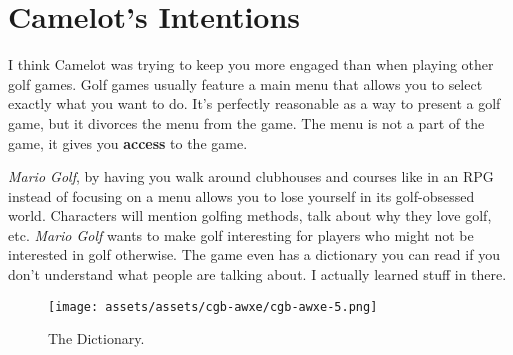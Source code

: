 \documentclass{book}
\let\oldcenter\center
\let\oldendcenter\endcenter
\renewenvironment{center}{\setlength\topsep{0pt}\oldcenter}{\oldendcenter}
\begin{document}
\FloatBarrier\needspace{10mm}\section*{Camelot’s Intentions}\nopagebreak[4]

I think Camelot was trying to keep you more engaged than when playing other golf games. Golf games usually feature a main menu that allows you to select exactly what you want to do. It’s perfectly reasonable as a way to present a golf game, but it divorces the menu from the game. The menu is not a part of the game, it gives you \textbf{access} to the game.

\begin{center}
\vspace{8pt}
\quad\vspace{4pt}
\end{center}

\emph{Mario Golf}, by having you walk around clubhouses and courses like in an RPG instead of focusing on a menu allows you to lose yourself in its golf-obsessed world. Characters will mention golfing methods, talk about why they love golf, etc. \emph{Mario Golf} wants to make golf interesting for players who might not be interested in golf otherwise. The game even has a dictionary you can read if you don’t understand what people are talking about. I actually learned stuff in there.

\begin{figure}[hbt]
\vskip 10pt
\centering \texttt{[image: assets/assets/cgb-awxe/cgb-awxe-5.png]}\par\pagetwodescription The Dictionary.
\vskip 6pt
\end{figure}
\end{document}
